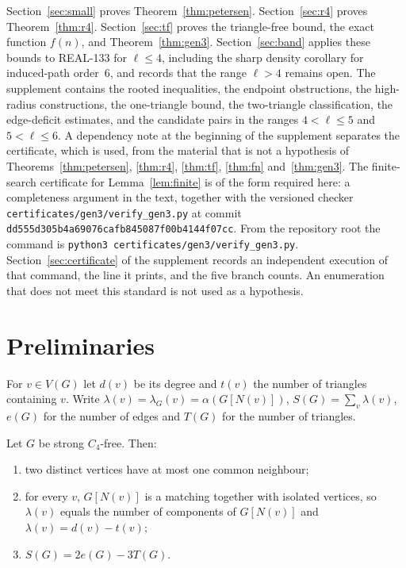 \documentclass[ASNA]{USG}
\theoremstyle{WBstyletwo}
\numberwithin{equation}{section}
\newcommand{\lr}{\ell}
\begin{document}
Section~\ref{sec:small} proves Theorem~\ref{thm:petersen}. Section~\ref{sec:r4} proves Theorem~\ref{thm:r4}. Section~\ref{sec:tf} proves the triangle-free bound, the exact function $f(n)$, and Theorem~\ref{thm:gen3}. Section~\ref{sec:band} applies these bounds to REAL-133 for $\lr\le 4$, including the sharp density corollary for induced-path order~$6$, and records that the range $\lr>4$ remains open. The supplement contains the rooted inequalities, the endpoint obstructions, the high-radius constructions, the one-triangle bound, the two-triangle classification, the edge-deficit estimates, and the candidate pairs in the ranges $4<\lr\le 5$ and $5<\lr\le 6$. A dependency note at the beginning of the supplement separates the certificate, which is used, from the material that is not a hypothesis of Theorems~\ref{thm:petersen}, \ref{thm:r4}, \ref{thm:tf}, \ref{thm:fn} and~\ref{thm:gen3}. The finite-search certificate for Lemma~\ref{lem:finite} is of the form required here: a completeness argument in the text, together with the versioned checker \texttt{certificates/gen3/verify\_gen3.py} at commit \texttt{dd555d305b4a69076cafb845087f00b4144f07cc}. From the repository root the command is \texttt{python3 certificates/gen3/verify\_gen3.py}. Section~\ref{sec:certificate} of the supplement records an independent execution of that command, the line it prints, and the five branch counts. An enumeration that does not meet this standard is not used as a hypothesis.


\section{Preliminaries}\label{sec:prelim}

For $v\in V(G)$ let $d(v)$ be its degree and $t(v)$ the number of triangles containing $v$. Write $\lambda(v)=\lambda_G(v)=\alpha(G[N(v)])$, $S(G)=\sum_v\lambda(v)$, $e(G)$ for the number of edges and $T(G)$ for the number of triangles.

\begin{lemma}\label{lem:basic}
Let $G$ be strong $C_4$-free. Then:
\begin{enumerate}
\item two distinct vertices have at most one common neighbour;
\item for every $v$, $G[N(v)]$ is a matching together with isolated vertices, so $\lambda(v)$ equals the number of components of $G[N(v)]$ and $\lambda(v)=d(v)-t(v)$;
\item $S(G)=2e(G)-3T(G)$.
\end{enumerate}
\end{lemma}
\end{document}

